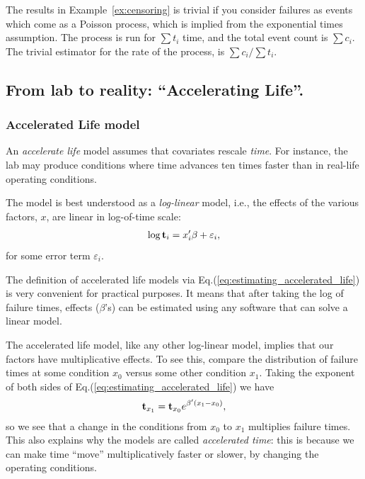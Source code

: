 \begin{extra}
The results in Example~\ref{ex:censoring} is trivial if you consider failures as events which come as a Poisson process, which is implied from the exponential times assumption. 
The process is run for $\sum t_i$ time, and the total event count is $\sum c_i$. 
The trivial estimator for the rate of the process, is $\sum c_i/\sum t_i$.
\end{extra}






\subsection{From lab to reality: ``Accelerating Life''.}


\subsubsection{Accelerated Life model}
An \emph{accelerate life} model assumes that covariates rescale \emph{time}. 
For instance, the lab may produce conditions where time advances ten times faster than in real-life operating conditions.


The model is best understood as a \emph{log-linear} model, i.e., the effects of the various factors, $x$, are linear in log-of-time scale:
\begin{align}
\label{eq:estimating_accelerated_life}
	\log \mathbf{t}_i = x_i'\beta + \varepsilon_i,
\end{align}
for some error term $\varepsilon_i$. 

The definition of accelerated life models via Eq.(\ref{eq:estimating_accelerated_life}) is very convenient for practical purposes. 
It means that after taking the log of failure times, effects ($\beta$'s) can be estimated using any software that can solve a linear model. 

The accelerated life model, like any other log-linear model, implies that our factors have multiplicative effects.
To see this, compare the distribution of failure times at some condition $x_0$ versus some other condition $x_1$.
Taking the exponent of both sides of Eq.(\ref{eq:estimating_accelerated_life}) we have
\begin{align}
	\mathbf{t}_{x_1} = \mathbf{t}_{x_0} e^{\beta'(x_1-x_0)},
\end{align}
so we see that a change in the conditions from $x_0$ to $x_1$ multiplies failure times. 
This also explains why the models are called \emph{accelerated time}: this is because we can make time ``move'' multiplicatively faster or slower, by changing the operating conditions. 



